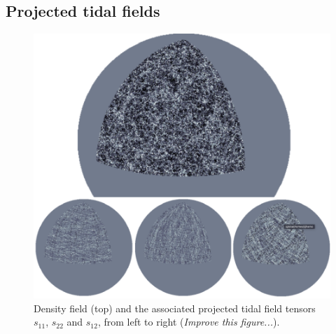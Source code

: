 

\subsection{Projected tidal fields}
\label{subsec:IA_sims}

\begin{figure}
\includegraphics[width=\columnwidth]{graphs/TidalFieldOuterRim_V0}
\caption{Density field (top)  and the associated projected tidal field tensors $s_{11}$, $s_{22}$ and $s_{12}$, from left to right ({\it Improve this figure...}).}
\label{fig:maps}
\end{figure}



